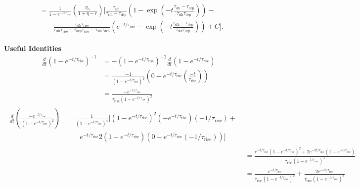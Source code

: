 \documentclass[12pt]{article}
\newcommand{\timescale}[1]{\ensuremath{\tau_\text{#1}}}
\begin{document}
\begin{subequations}
\begin{align}
\begin{split} %
&= \frac{1}{1 - e^{-t / \timescale{rise}}}
\left(\frac{y_\alpha}{1 + \eta - r}\right)
\bigg[\frac{
	\timescale{sfh}
}{
	\timescale{sfh} - \timescale{dep}
} \left(
1 - \exp\left(-t\frac{
	\timescale{sfh} - \timescale{dep}
}{
	\timescale{sfh}\timescale{dep}
}\right)
\right) -
\\
&\qquad \frac{
	\timescale{sfh}\timescale{rise}
}{
	\timescale{sfh}\timescale{rise} - \timescale{dep}\timescale{rise} -
	\timescale{sfh}\timescale{dep}
} \left(e^{-t / \timescale{rise}} -
\exp\left(-t
\frac{
	\timescale{sfh} - \timescale{dep}
}{
	\timescale{sfh}\timescale{dep}
}
\right)
\right) + C\bigg].
\end{split}
\label{eq:zalpha-full}
\end{align}\end{subequations}

\newpage
\noindent
\textbf{Useful Identities}
\begin{subequations}\begin{align}
\frac{d}{dt}\left(1 - e^{-t / \timescale{rise}}\right)^{-1} &=
-\left(1 - e^{-t / \timescale{rise}}\right)^{-2}
\frac{d}{dt}\left(1 - e^{-t / \timescale{rise}}\right)
\\
&= \frac{-1}{\left(1 - e^{-t / \timescale{rise}}\right)^2}
\left(0 - e^{-t / \timescale{rise}}\left(\frac{-t}{\timescale{rise}}\right)
\right)
\\
&= \frac{
	-e^{-t / \timescale{rise}}
}{
	\timescale{rise} \left(1 - e^{-t / \timescale{rise}}\right)^2
}
\end{align}\end{subequations}
\begin{subequations}\begin{align}
\begin{split}
\frac{d}{dt}\left(\frac{
	-e^{-t / \timescale{rise}}
}{
	\left(1 - e^{-t / \timescale{rise}}\right)^2
}\right) &= \frac{1}{(1 - e^{-t / \timescale{rise}})^4}\bigg[
\left(1 - e^{-t / \timescale{rise}}\right)^2
\left(-e^{-t / \timescale{rise}}\right)
\left(-1 / \timescale{rise}\right) +
\\
&\qquad e^{-t / \timescale{rise}}
2\left(1 - e^{-t / \timescale{rise}}\right)
\left(0 - e^{-t / \timescale{rise}}\left(-1 / \timescale{rise}\right)\right)
\bigg]
\end{split}
\\
&= \frac{
	e^{-t / \timescale{rise}}
	\left(1 - e^{-t / \timescale{rise}}\right)^2 +
	2e^{-2t / \timescale{rise}}
	\left(1 - e^{-t / \timescale{rise}}\right)
}{
	\timescale{rise} \left(1 - e^{-t / \timescale{rise}}\right)^4
}
\\
&= \frac{
	e^{-t / \timescale{rise}}
}{
	\timescale{rise} \left(1 - e^{-t / \timescale{rise}}\right)^2
} + \frac{
	2 e^{-2t / \timescale{rise}}
}{
	\timescale{rise} \left(1 - e^{-t / \timescale{rise}}\right)^3
}
\end{align}\end{subequations}
\end{document}
